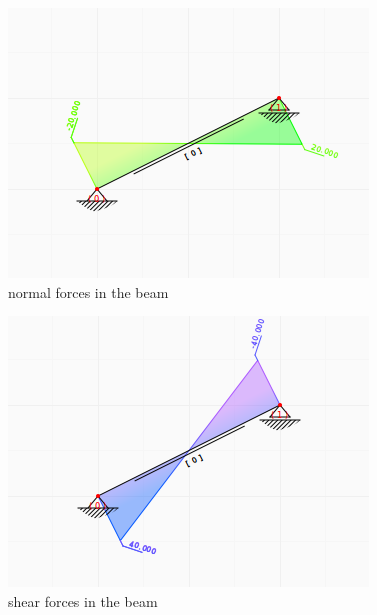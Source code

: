 \documentclass[a4paper,11pt]{report}
\begin{document}
\begin{minipage}[h]{0.3\textwidth}
\begin{figure}[H]
\begin{center}
\includegraphics[width=\textwidth]{../pictures/normalforceresults.png}
\caption{normal forces in the beam}
\label{pic:normalbeamforce}
\end{center}
\end{figure}
\end{minipage}
\hfill
\begin{minipage}[h]{0.3\textwidth}
\begin{figure}[H]
\begin{center}
\includegraphics[width=\textwidth]{../pictures/shearforcesresults.png}
\caption{shear forces in the beam}
\label{pic:shearbeamforce}
\end{center}
\end{figure}
\end{minipage}
\end{document}

